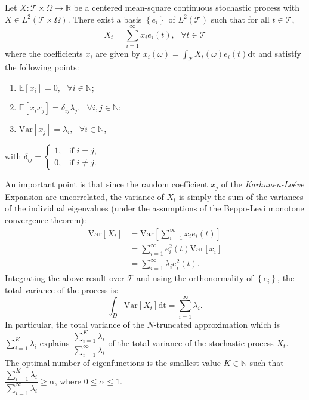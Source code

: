 \begin{theorem}[Karhunen-Lo\'{e}ve]\label{kl_expansion}
Let $X: \mathcal{T} \times \Omega \rightarrow \mathbb{R}$ be a centered mean-square continuous stochastic process with $X \in L^2\left(\mathcal{T} \times \Omega\right)$. There exist a basis $\left\{e_i\right\}$ of $L^2\left(\mathcal{T} \right)$ such that for all $t \in \mathcal{T}$,
\begin{equation}
X_t = \sum_{i=1}^{\infty} x_i e_i(t), \text{ } \forall t \in \mathcal{T}
\end{equation}
where the coefficients $x_i$ are given by $x_i(\omega) = \int_{\mathcal{T}} X_t(\omega) e_i(t) \mathrm{dt}$ and satistfy the following points:
\begin{enumerate}
\item $\mathbb{E}\left[x_i\right] = 0,\text{ }\forall i \in \mathbb{N}$;
\item $\mathbb{E}\left[x_i x_j\right] = \delta_{ij} \lambda_j, \text{ }\forall i,j \in \mathbb{N}$;
\item $\text{Var}\left[x_j\right] = \lambda_i,\text{ }\forall i \in \mathbb{N}$,
\end{enumerate}
with $\delta_{ij} =
     \begin{cases}
             1, &         \text{if } i=j,\\
             0, &         \text{if } i\neq j.
     \end{cases}$
\end{theorem}

An important point is that since the random coefficient $x_j$ of the \textit{Karhunen-Lo\'{e}ve} Expansion are uncorrelated, the variance of $X_t$ is simply the sum of the variances of the individual eigenvalues (under the assumptions of the Beppo-Levi monotone convergence theorem):
\begin{align}
\text{Var}\left[X_t\right] &= \text{Var}\left[\sum_{i=1}^{\infty} x_i e_i(t)\right] \nonumber \\
&= \sum_{i=1}^{\infty} e^2_i(t) \text{Var}\left[x_i\right] \nonumber \\
&= \sum_{i=1}^{\infty} \lambda_i e^2_i(t) \nonumber.
\end{align}
Integrating the above result over $\mathcal{T}$ and using the orthonormality of $\left\{e_i\right\}$, the total variance of the process is:
\begin{equation}
\int_{D} \text{Var}\left[X_t\right] \mathrm{dt} = \sum_{i=1}^{\infty} \lambda_i.
\end{equation}
In particular, the total variance of the $N$-truncated approximation which is $\sum_{i=1}^{K} \lambda_i$ explains $\dfrac{\sum_{i=1}^{K} \lambda_i}{\sum_{i=1}^{\infty} \lambda_i}$ of the total variance of the stochastic process $X_t$. The optimal number of eigenfunctions is the smallest value $K \in \mathbb{N}$ such that $\dfrac{\sum_{i=1}^{K} \lambda_i}{\sum_{i=1}^{\infty} \lambda_i} \geq \alpha$, where $0 \leq \alpha \leq 1$.

